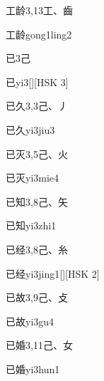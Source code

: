 \begin{entry}{工龄}{3,13}{⼯、⿒}
  \begin{phonetics}{工龄}{gong1ling2}
  \end{phonetics}
\end{entry}

\begin{entry}{已}{3}{⼰}
  \begin{phonetics}{已}{yi3}[][HSK 3]
  \end{phonetics}
\end{entry}

\begin{entry}{已久}{3,3}{⼰、⼃}
  \begin{phonetics}{已久}{yi3jiu3}
  \end{phonetics}
\end{entry}

\begin{entry}{已灭}{3,5}{⼰、⽕}
  \begin{phonetics}{已灭}{yi3mie4}
  \end{phonetics}
\end{entry}

\begin{entry}{已知}{3,8}{⼰、⽮}
  \begin{phonetics}{已知}{yi3zhi1}
  \end{phonetics}
\end{entry}

\begin{entry}{已经}{3,8}{⼰、⽷}
  \begin{phonetics}{已经}{yi3jing1}[][HSK 2]
  \end{phonetics}
\end{entry}

\begin{entry}{已故}{3,9}{⼰、⽁}
  \begin{phonetics}{已故}{yi3gu4}
  \end{phonetics}
\end{entry}

\begin{entry}{已婚}{3,11}{⼰、⼥}
  \begin{phonetics}{已婚}{yi3hun1}
  \end{phonetics}
\end{entry}

